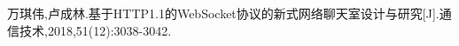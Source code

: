 \begin{UndergraduateThesis}

    \begin{enumerate}[{label=[\arabic*]}]
        \item 万琪伟,卢成林.基于HTTP1.1的WebSocket协议的新式网络聊天室设计与研究[J].通信技术,2018,51(12):3038-3042.
    \end{enumerate}

\end{UndergraduateThesis}